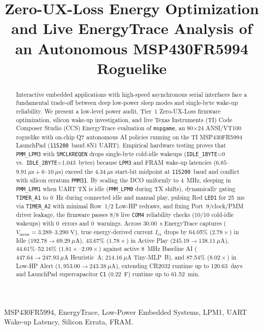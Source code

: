 \documentclass[conference]{IEEEtran}
\title{Zero-UX-Loss Energy Optimization and Live EnergyTrace Analysis of an Autonomous MSP430FR5994 Roguelike}
\author{\IEEEauthorblockN{joaogpd}
\IEEEauthorblockA{\textit{mspgame Embedded Systems Project} \\
TI MSP430FR5994 LaunchPad Platform}}
\begin{document}
\maketitle

\begin{abstract}
Interactive embedded applications with high-speed asynchronous serial interfaces face a fundamental trade-off between deep low-power sleep modes and single-byte wake-up reliability. We present a low-level power audit, Tier~1 Zero-UX-Loss firmware optimization, silicon wake-up investigation, and live Texas Instruments (TI) Code Composer Studio (CCS) EnergyTrace evaluation of \texttt{mspgame}, an 80$\times$24 ANSI/VT100 roguelike with on-chip Q7 autonomous AI policies running on the TI MSP430FR5994 LaunchPad (\texttt{115200}~baud 8N1 UART). Empirical hardware testing proves that \texttt{PMM\_LPM3} with \texttt{SMCLKREQEN} drops single-byte cold-idle wakeups (\texttt{IDLE\_1BYTE}=0 vs.\ \texttt{IDLE\_2BYTE}=1,043~bytes) because \texttt{LPM3} and FRAM wake-up latencies ($6.85$--$9.91~\mu\text{s} + 6$--$10~\mu\text{s}$) exceed the $4.34~\mu\text{s}$ start-bit midpoint at \texttt{115200}~baud and conflict with silicon erratum \texttt{PMM31}. By scaling the DCO uniformly to 4~MHz, sleeping in \texttt{PMM\_LPM1} when UART TX is idle (\texttt{PMM\_LPM0} during TX shifts), dynamically gating \texttt{TIMER\_A1} to 0~Hz during connected idle and manual play, pulsing Red \texttt{LED1} for 25~ms via \texttt{TIMER\_A2} with minimal Row~1/2 Low-HP redraws, and fixing Port~9/clock/PMM driver leakage, the firmware passes 8/8 live \texttt{COM4} reliability checks (10/10 cold-idle wakeups) with 0~errors and 0~warnings. Across 30.00~s EnergyTrace captures ($V_{\text{mean}}=3.289$--$3.290\text{~V}$), true energy-derived current $I_{\text{ev}}$ drops by 64.05\% ($2.78\times$) in Idle ($192.78\rightarrow 69.29~\mu\text{A}$), 43.67\% ($1.78\times$) in Active Play ($245.19\rightarrow 138.11~\mu\text{A}$), 44.61\%--52.16\% ($1.81\times$--$2.09\times$) against active 8~MHz Baseline AI ($447.64\rightarrow 247.93~\mu\text{A}$ Heuristic~A; $214.16~\mu\text{A}$ Tiny-MLP~B), and 87.54\% ($8.02\times$) in Low-HP Alert ($1,953.00\rightarrow 243.38~\mu\text{A}$), extending CR2032 runtime up to 120.63~days and LaunchPad supercapacitor \texttt{C1} (0.22~F) runtime up to 61.52~min.
\end{abstract}

\begin{IEEEkeywords}
MSP430FR5994, EnergyTrace, Low-Power Embedded Systems, LPM1, UART Wake-up Latency, Silicon Errata, FRAM.
\end{IEEEkeywords}
\end{document}
